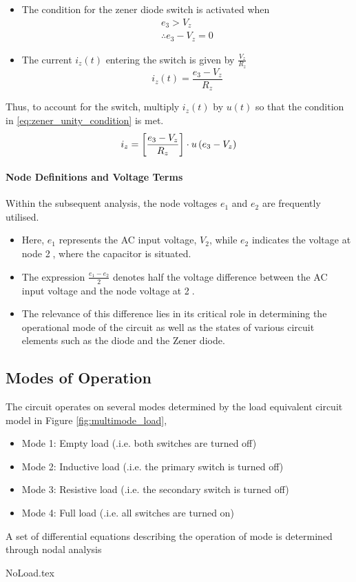 \begin{itemize}
	\item The condition for the zener diode switch is activated when \begin{equation}
		\begin{split}
			e_3 > V_z \\
			\therefore e_3 - V_z = 0
			\label{eq:zener_unity_condition}
		\end{split}
	\end{equation}
	\item The current $i_z(t)$ entering the switch is given by $\frac{V_z}{R_z}$
	\begin{equation}
		i_z(t) = \frac{e_3 - V_z}{R_z}
	\end{equation}
\end{itemize}
Thus, to account for the switch, multiply $i_z(t)$ by $u(t)$ so that the condition in \eqref{eq:zener_unity_condition} is met.
\begin{equation}
    i_z = \left[\frac{e_3 - V_z}{R_z} \right]\cdot u\left(e_3 - V_z \right)
    \label{eq:zener_current}
\end{equation}

\paragraph{Node Definitions and Voltage Terms}
Within the subsequent analysis, the node voltages $e_1$ and $e_2$ are frequently utilised.
\begin{itemize}
	\item Here, $e_1$ represents the AC input voltage, $V_2$, while $e_2$ indicates the voltage at node \textcircled{2}, where the capacitor is situated.
	\item The expression $\frac{e_1 - e_2}{2}$ denotes half the voltage difference between the AC input voltage and the node voltage at \textcircled{2}.
	\item The relevance of this difference lies in its critical role in determining the operational mode of the circuit as well as the states of various circuit elements such as the diode and the Zener diode.
\end{itemize}

\pagebreak
\subsection{Modes of Operation}
The circuit operates on several modes determined by the load equivalent circuit model in Figure \ref{fig:multimode_load},
\begin{itemize}
	\item Mode 1: Empty load (.i.e. both switches are turned off)
	\item Mode 2: Inductive load (.i.e. the primary switch is turned off)
	\item Mode 3: Resistive load (.i.e. the secondary switch is turned off) 
	\item Mode 4: Full load (.i.e. all switches are turned on)
\end{itemize}
A set of differential equations describing the operation of mode is determined through nodal analysis

{NoLoad.tex}
